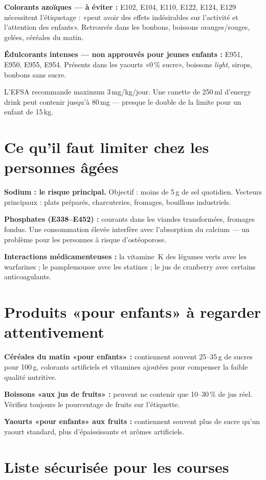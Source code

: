 \documentclass[a5paper,12pt,oneside,openany]{book}
\newcommand{\boxrouge}[2]{%
  \begin{tcolorbox}[boitebase,
    colback=rouge!8!white, colframe=rouge, title={#1}]
  #2\end{tcolorbox}}
\begin{document}
\textbf{Colorants azoïques --- à éviter :}
E102, E104, E110, E122, E124, E129 nécessitent l'étiquetage : «peut avoir des
effets indésirables sur l'activité et l'attention des enfants». Retrouvés dans
les bonbons, boissons oranges/rouges, gelées, céréales du matin.

\textbf{Édulcorants intenses --- non approuvés pour jeunes enfants :}
E951, E950, E955, E954. Présents dans les yaourts «0\,\% sucre», boissons
\textit{light}, sirops, bonbons sans sucre.

\boxrouge{Caféine}{L'EFSA recommande maximum 3\,mg/kg/jour. Une canette de
250\,ml d'energy drink peut contenir jusqu'à 80\,mg --- presque le double
de la limite pour un enfant de 15\,kg.}

\section{Ce qu'il faut limiter chez les personnes âgées}

\textbf{Sodium : le risque principal.} Objectif : moins de 5\,g de sel
quotidien. Vecteurs principaux : plats préparés, charcuteries, fromages,
bouillons industriels.

\textbf{Phosphates (E338--E452) :} courants dans les viandes transformées,
fromages fondus. Une consommation élevée interfère avec l'absorption du calcium
--- un problème pour les personnes à risque d'ostéoporose.

\textbf{Interactions médicamenteuses :} la vitamine~K des légumes verts avec
les warfarines ; le pamplemousse avec les statines ; le jus de cranberry avec
certains anticoagulants.

\section{Produits «pour enfants» à regarder attentivement}

\textbf{Céréales du matin «pour enfants» :} contiennent souvent 25--35\,g de
sucres pour 100\,g, colorants artificiels et vitamines ajoutées pour
compenser la faible qualité nutritive.

\textbf{Boissons «aux jus de fruits» :} peuvent ne contenir que 10--30\,\% de
jus réel. Vérifiez toujours le pourcentage de fruits sur l'étiquette.

\textbf{Yaourts «pour enfants» aux fruits :} contiennent souvent plus de sucre
qu'un yaourt standard, plus d'épaississants et arômes artificiels.

\section{Liste sécurisée pour les courses}
\end{document}
